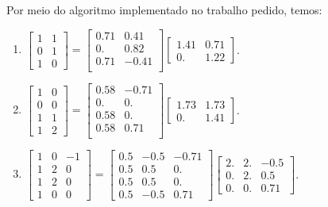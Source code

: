 \begin{resolution}
  Por meio do algoritmo implementado no trabalho pedido, temos:
  \begin{enumerate}[label=\alph*)]
    \item $\begin{bmatrix}
              1 & 1 \\ 0 & 1 \\ 1 & 0
            \end{bmatrix} = \begin{bmatrix}
              0.71 & 0.41  \\
              0.   & 0.82  \\
              0.71 & -0.41 \\
            \end{bmatrix} \begin{bmatrix}
              1.41 & 0.71 \\
              0.   & 1.22
            \end{bmatrix}$.
    \item $\begin{bmatrix}
              1 & 0 \\ 0 & 0 \\ 1 & 1 \\ 1 & 2
            \end{bmatrix} = \begin{bmatrix}
              0.58 & -0.71 \\
              0.   & 0.    \\
              0.58 & 0.    \\
              0.58 & 0.71  \\
            \end{bmatrix} \begin{bmatrix}
              1.73 & 1.73 \\
              0.   & 1.41
            \end{bmatrix}$.
    \item $\begin{bmatrix}
              1 & 0 & -1 \\ 1 & 2 & 0 \\ 1 & 2 & 0 \\ 1 & 0 & 0
            \end{bmatrix} = \begin{bmatrix}
              0.5 & -0.5 & -0.71 \\
              0.5 & 0.5  & 0.    \\
              0.5 & 0.5  & 0.    \\
              0.5 & -0.5 & 0.71
            \end{bmatrix} \begin{bmatrix}
              2. & 2. & -0.5 \\
              0. & 2. & 0.5  \\
              0. & 0. & 0.71
            \end{bmatrix}$.
  \end{enumerate}
\end{resolution}

